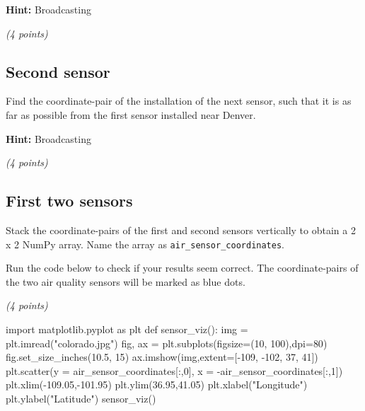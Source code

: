 \documentclass[
  letterpaper,
  DIV=11,
  numbers=noendperiod]{scrreprt}
\newenvironment{Shaded}{\begin{snugshade}}{\end{snugshade}}
\newcommand{\DecValTok}[1]{\textcolor[rgb]{0.68,0.00,0.00}{#1}}
\newcommand{\FloatTok}[1]{\textcolor[rgb]{0.68,0.00,0.00}{#1}}
\newcommand{\ImportTok}[1]{\textcolor[rgb]{0.00,0.46,0.62}{#1}}
\newcommand{\KeywordTok}[1]{\textcolor[rgb]{0.00,0.23,0.31}{#1}}
\newcommand{\NormalTok}[1]{\textcolor[rgb]{0.00,0.23,0.31}{#1}}
\newcommand{\OperatorTok}[1]{\textcolor[rgb]{0.37,0.37,0.37}{#1}}
\newcommand{\StringTok}[1]{\textcolor[rgb]{0.13,0.47,0.30}{#1}}
\begin{document}
\textbf{Hint:} Broadcasting

\emph{(4 points)}

\hypertarget{second-sensor}{%
\subsection{Second sensor}\label{second-sensor}}

Find the coordinate-pair of the installation of the next sensor, such
that it is as far as possible from the first sensor installed near
Denver.

\textbf{Hint:} Broadcasting

\emph{(4 points)}

\hypertarget{first-two-sensors}{%
\subsection{First two sensors}\label{first-two-sensors}}

Stack the coordinate-pairs of the first and second sensors vertically to
obtain a 2 x 2 NumPy array. Name the array as
\texttt{air\_sensor\_coordinates}.

Run the code below to check if your results seem correct. The
coordinate-pairs of the two air quality sensors will be marked as blue
dots.

\emph{(4 points)}

\begin{Shaded}
\begin{Highlighting}[]
\ImportTok{import}\NormalTok{ matplotlib.pyplot }\ImportTok{as}\NormalTok{ plt}
\KeywordTok{def}\NormalTok{ sensor\_viz():}
\NormalTok{    img }\OperatorTok{=}\NormalTok{ plt.imread(}\StringTok{"colorado.jpg"}\NormalTok{)}
\NormalTok{    fig, ax }\OperatorTok{=}\NormalTok{ plt.subplots(figsize}\OperatorTok{=}\NormalTok{(}\DecValTok{10}\NormalTok{, }\DecValTok{100}\NormalTok{),dpi}\OperatorTok{=}\DecValTok{80}\NormalTok{)}
\NormalTok{    fig.set\_size\_inches(}\FloatTok{10.5}\NormalTok{, }\DecValTok{15}\NormalTok{)}
\NormalTok{    ax.imshow(img,extent}\OperatorTok{=}\NormalTok{[}\OperatorTok{{-}}\DecValTok{109}\NormalTok{, }\OperatorTok{{-}}\DecValTok{102}\NormalTok{, }\DecValTok{37}\NormalTok{, }\DecValTok{41}\NormalTok{])}
\NormalTok{    plt.scatter(y }\OperatorTok{=}\NormalTok{ air\_sensor\_coordinates[:,}\DecValTok{0}\NormalTok{], x }\OperatorTok{=} \OperatorTok{{-}}\NormalTok{air\_sensor\_coordinates[:,}\DecValTok{1}\NormalTok{])}
\NormalTok{    plt.xlim(}\OperatorTok{{-}}\FloatTok{109.05}\NormalTok{,}\OperatorTok{{-}}\FloatTok{101.95}\NormalTok{)}
\NormalTok{    plt.ylim(}\FloatTok{36.95}\NormalTok{,}\FloatTok{41.05}\NormalTok{)}
\NormalTok{    plt.xlabel(}\StringTok{"Longitude"}\NormalTok{)}
\NormalTok{    plt.ylabel(}\StringTok{"Latitude"}\NormalTok{)}
\NormalTok{sensor\_viz()}
\end{Highlighting}
\end{Shaded}
\end{document}
